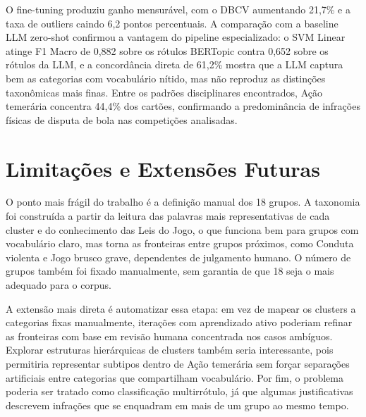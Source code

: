 \documentclass[
12pt,
openany,
oneside,
a4paper,
chapter=TITLE,
english,
french,
spanish,
brazil
]{USPSC-classe/USPSC}
\begin{document}
O fine-tuning produziu ganho mensurável, com o DBCV aumentando 21,7\% e a taxa de outliers caindo 6,2 pontos percentuais. A comparação com a baseline LLM zero-shot confirmou a vantagem do pipeline especializado: o SVM Linear atinge F1 Macro de 0,882 sobre os rótulos BERTopic contra 0,652 sobre os rótulos da LLM, e a concordância direta de 61,2\% mostra que a LLM captura bem as categorias com vocabulário nítido, mas não reproduz as distinções taxonômicas mais finas. Entre os padrões disciplinares encontrados, Ação temerária concentra 44,4\% dos cartões, confirmando a predominância de infrações físicas de disputa de bola nas competições analisadas.

\section{Limitações e Extensões Futuras}

O ponto mais frágil do trabalho é a definição manual dos 18 grupos. A taxonomia foi construída a partir da leitura das palavras mais representativas de cada cluster e do conhecimento das Leis do Jogo, o que funciona bem para grupos com vocabulário claro, mas torna as fronteiras entre grupos próximos, como Conduta violenta e Jogo brusco grave, dependentes de julgamento humano. O número de grupos também foi fixado manualmente, sem garantia de que 18 seja o mais adequado para o corpus.

A extensão mais direta é automatizar essa etapa: em vez de mapear os clusters a categorias fixas manualmente, iterações com aprendizado ativo poderiam refinar as fronteiras com base em revisão humana concentrada nos casos ambíguos. Explorar estruturas hierárquicas de clusters também seria interessante, pois permitiria representar subtipos dentro de Ação temerária sem forçar separações artificiais entre categorias que compartilham vocabulário. Por fim, o problema poderia ser tratado como classificação multirrótulo, já que algumas justificativas descrevem infrações que se enquadram em mais de um grupo ao mesmo tempo.

\postextual


\end{document}
